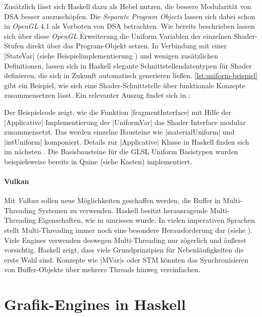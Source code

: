 Zusätzlich lässt sich Haskell dazu als Hebel nutzen, die bessere Modularität von \ac{DSA} besser auszuschöpfen. Die \textit{Separate Program Objects} lassen sich dabei schon in \textit{OpenGL} 4.1 als Vorboten von \ac{DSA} betrachten. Wie bereits beschrieben lassen sich über diese \textit{OpenGL} Erweiterung die Uniform Variablen der einzelnen Shader-Stufen direkt über das Program-Objekt setzen. In Verbindung mit einer |StateVar| (siehe Beispielimplementierung ) und wenigen zusätzlichen Definitionen, lassen sich in Haskell elegante Schnittstellendatentypen für Shader definieren, die sich in Zukunft automatisch generieren ließen. \ref{lst:uniform-beispiel} gibt ein Beispiel, wie sich eine Shader-Schnittstelle über funktionale Konzepte zusammensetzen lässt. Ein relevanter Auszug findet sich in :

\endgroup

Der Beispielcode zeigt, wie die Funktion |fragmentInterface| mit Hilfe der |Applicative| Implementierung der |UniformVar| das Shader Interface modular zusammensetzt. Das werden einzelne Bausteine wie |materialUniform| und |intUniform| komponiert. Details zur |Applicative| Klasse in Haskell finden sich im nächsten . Die Basisbausteine für die GLSL Uniform Basistypen wurden beispielsweise bereits in Quine (siehe Kasten) implementiert.


\paragraph{Vulkan} Mit \textit{Vulkan} sollen neue Möglichkeiten geschaffen werden, die Buffer in Multi-Threading Systemen zu verwenden. Haskell besitzt herausragende Multi-Threading Eigenschaften, wie in  umrissen wurde. In vielen imperativen Sprachen stellt Multi-Threading immer noch eine besondere Herausforderung dar (siehe ). Viele Engines verwenden deswegen Multi-Threading nur zögerlich und äußerst vorsichtig. Haskell zeigt, dass viele Grundprinzipien für Nebenläufigkeiten die erste Wahl sind. Konzepte wie |MVar|s oder \ac{STM} könnten das Synchronisieren von Buffer-Objekte über mehrere Threads hinweg vereinfachen.

\section{Grafik-Engines in Haskell}

